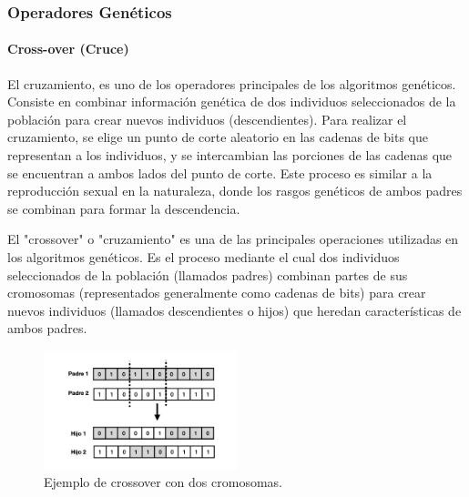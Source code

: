 \subsubsection{Operadores Genéticos}


\paragraph{Cross-over (Cruce)}
El cruzamiento, es uno de los operadores principales de los algoritmos genéticos. Consiste en combinar información genética de dos individuos seleccionados de la población para crear nuevos individuos (descendientes). Para realizar el cruzamiento, se elige un punto de corte aleatorio en las cadenas de bits que representan a los individuos, y se intercambian las porciones de las cadenas que se encuentran a ambos lados del punto de corte. Este proceso es similar a la reproducción sexual en la naturaleza, donde los rasgos genéticos de ambos padres se combinan para formar la descendencia.

El "crossover" o "cruzamiento" es una de las principales operaciones utilizadas en los algoritmos genéticos. Es el proceso mediante el cual dos individuos seleccionados de la población (llamados padres) combinan partes de sus cromosomas (representados generalmente como cadenas de bits) para crear nuevos individuos (llamados descendientes o hijos) que heredan características de ambos padres.

\begin{figure}
  \centering
  \includegraphics[width=0.5\textwidth]{images/crossOver}
  \caption{Ejemplo de crossover con dos cromosomas.}
\end{figure}






